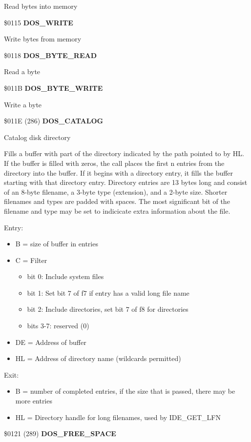 Read bytes into memory

\$0115 \textbf{DOS\_WRITE}

Write bytes from memory

\$0118 \textbf{DOS\_BYTE\_READ}

Read a byte

\$011B \textbf{DOS\_BYTE\_WRITE}

Write a byte

\$011E (286) \textbf{DOS\_CATALOG}

Catalog disk directory

Fills a buffer with part of the directory indicated by the path
pointed to by HL. If the buffer is filled with zeros, the call places
the first n entries from the directory into the buffer. If it begins
with a directory entry, it fills the buffer starting with that
directory entry. Directory entries are 13 bytes long and consist of an
8-byte filename, a 3-byte type (extension), and a 2-byte size. Shorter
filenames and types are padded with spaces. The most significant bit
of the filename and type may be set to indicicate extra information
about the file.

Entry:
\begin{itemize}
\item[] B = size of buffer in entries
\item[] C = Filter
  \begin{itemize}
  \item[] bit 0: Include system files
  \item[] bit 1: Set bit 7 of f7 if entry has a valid long file name
  \item[] bit 2: Include directories, set bit 7 of f8 for directories
  \item[] bits 3-7: reserved (0) 
  \end{itemize}
\item[] DE = Address of buffer
\item[] HL = Address of directory name (wildcards permitted)
\end{itemize}
Exit:
\begin{itemize}
\item[] B = number of completed entries, if the size that is passed,
  there may be more entries
\item[] HL = Directory handle for long filenames, used by
  IDE\_GET\_LFN
\end{itemize}

\$0121 (289) \textbf{DOS\_FREE\_SPACE}

